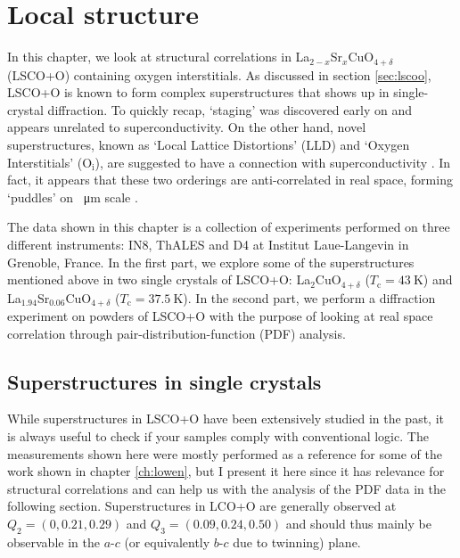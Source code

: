 \chapter{Local structure}\label{ch:local}
In this chapter, we look at structural correlations in La$_{2-x}$Sr$_x$CuO$_{4+\delta}$ (LSCO+O) containing oxygen interstitials. As discussed in section \ref{sec:lscoo}, LSCO+O is known to form complex superstructures that shows up in single-crystal diffraction. To quickly recap, `staging' \cite{Wells1997,Ray2017} was discovered early on and appears unrelated to superconductivity. On the other hand, novel superstructures, known as `Local Lattice Distortions' (LLD) and `Oxygen Interstitials' (O$_\text{i}$), are suggested to have a connection with superconductivity \cite{Poccia2011}. In fact, it appears that these two orderings are anti-correlated in real space, forming `puddles' on \SI{}{\micro\meter} scale \cite{Poccia2012}.

The data shown in this chapter is a collection of experiments performed on three different instruments: IN8, ThALES and D4 at Institut Laue-Langevin in Grenoble, France. In the first part, we explore some of the superstructures mentioned above in two single crystals of LSCO+O: La$_2$CuO$_{4+\delta}$ ($T_\text{c} = \SI{43}{\kelvin}$) and La$_{1.94}$Sr$_{0.06}$CuO$_{4+\delta}$ ($T_\text{c} = \SI{37.5}{\kelvin}$). In the second part, we perform a diffraction experiment on powders of LSCO+O with the purpose of looking at real space correlation through pair-distribution-function (PDF) analysis.

\section{Superstructures in single crystals}\label{sec:single_crystal_superstructures}
While superstructures in LSCO+O have been extensively studied in the past, it is always useful to check if your samples comply with conventional logic. The measurements shown here were mostly performed as a reference for some of the work shown in chapter \ref{ch:lowen}, but I present it here since it has relevance for structural correlations and can help us with the analysis of the PDF data in the following section. Superstructures in LCO+O are generally observed at $Q_2 = (0, 0.21, 0.29)$ and $Q_3 = (0.09, 0.24, 0.50)$ \cite{Kusmartsev2000} and should thus mainly be observable in the $a$-$c$ (or equivalently $b$-$c$ due to twinning) plane.


